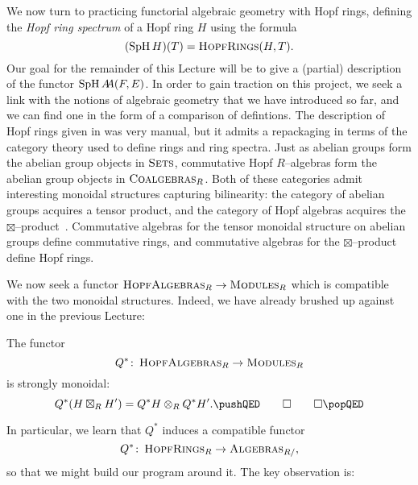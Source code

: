 We now turn to practicing functorial algebraic geometry with Hopf rings, defining the \textit{Hopf ring spectrum} of a Hopf ring \(H\) using the formula \[(\operatorname{SpH} H)(T) = \normalfont\textsc{HopfRings}(H, T).\]  Our goal for the remainder of this Lecture will be to give a (partial) description of the functor \(\operatorname{SpH} A\!\!A(F, E)\).  In order to gain traction on this project, we seek a link with the notions of algebraic geometry that we have introduced so far, and we can find one in the form of a comparison of defintions.  The description of Hopf rings given in  was very manual, but it admits a repackaging in terms of the category theory used to define rings and ring spectra.  Just as abelian groups form the abelian group objects in \(\normalfont\textsc{Sets}\), commutative Hopf \(R\)--algebras form the abelian group objects in \(\normalfont\textsc{Coalgebras}_R\).  Both of these categories admit interesting monoidal structures capturing bilinearity: the category of abelian groups acquires a tensor product, and the category of Hopf algebras acquires the \(\boxtimes\)--product~\cite[Section 5]{GoerssDieudonne}.  Commutative algebras for the tensor monoidal structure on abelian groups define commutative rings, and commutative algebras for the \(\boxtimes\)--product define Hopf rings.

We now seek a functor \(\normalfont\textsc{HopfAlgebras}_R \to \normalfont\textsc{Modules}_R\) which is compatible with the two monoidal structures.  Indeed, we have already brushed up against one in the previous Lecture:

\begin{lemma}
The functor \[Q^*\colon\thinspace \normalfont\textsc{HopfAlgebras}_R \to \normalfont\textsc{Modules}_R\] is strongly monoidal: \[Q^*(H \boxtimes_R H') = Q^* H \otimes_R Q^* H'. \pushQED\qed\qedhere\popQED\]
\end{lemma}

\noindent In particular, we learn that \(Q^*\) induces a compatible functor \[Q^*\colon\thinspace \normalfont\textsc{HopfRings}_R \to \normalfont\textsc{Algebras}_{R/},\] so that we might build our program around it.  The key observation is:

